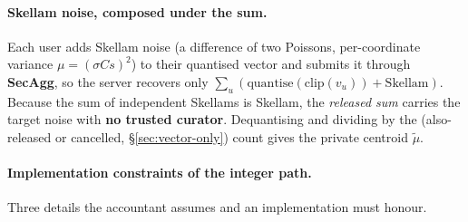 \documentclass[pdflatex,sn-mathphys-num,iicol]{sn-jnl}
\theoremstyle{thmstyleone}%
\theoremstyle{thmstyletwo}%
\theoremstyle{thmstylethree}%
\newcommand{\secref}[1]{\S\ref{#1}}
\begin{document}
\paragraph{Skellam noise, composed under the sum.} Each user adds Skellam noise
(a difference of two Poissons, per-coordinate variance $\mu = (\sigma C s)^2$) to
their quantised vector and submits it through \textbf{SecAgg}, so the server
recovers only $\sum_u (\mathrm{quantise}(\mathrm{clip}(v_u)) + \mathrm{Skellam})$.
Because the sum of independent Skellams is Skellam, the \emph{released sum} carries
the target noise with \textbf{no trusted curator}. Dequantising and dividing by the
(also-released or cancelled, \secref{sec:vector-only}) count gives the private
centroid $\tilde\mu$.

\paragraph{Implementation constraints of the integer path.} Three details the
accountant assumes and an implementation must honour.
\end{document}

